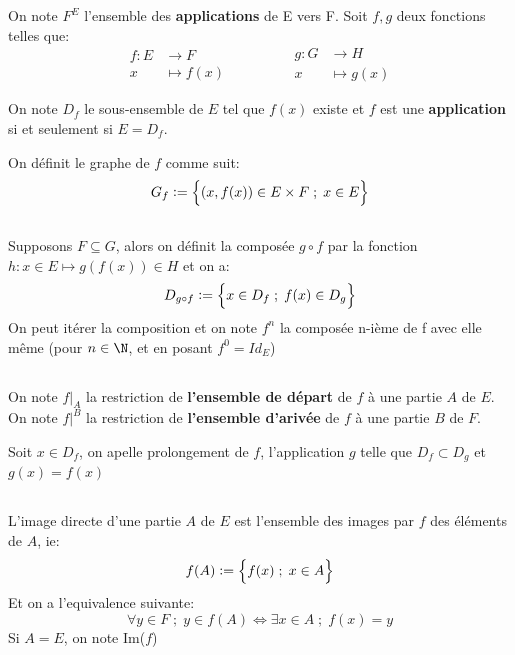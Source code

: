\chapter*{}
On note \(F^E\) l'ensemble des \textbf{applications} de E vers F.\+
Soit \(f, g\) deux fonctions telles que:
\[
   \begin{aligned}
      f: E &\longrightarrow F\\
      x &\longmapsto f(x)
   \end{aligned}
      \hspace{50pt}
   \begin{aligned}
      g: G&\longrightarrow H\\
      x&\longmapsto g(x)
   \end{aligned}
\]

On note \(D_f\) le sous-ensemble de \(E\) tel que \(f(x)\) existe et \(f\) est une \textbf{application} si et seulement si \(E = D_f\).\<

On définit le graphe de \(f\) comme suit:
\[
   G_f:= \Bigl\{ (x, f(x)) \in E \times F \; ; \; x \in E\Bigl\}   
\]

\section*{}
Supposons \(F \subseteq G\), alors on définit la composée \(g \circ f\) par la fonction \(h: x \in E \longmapsto g(f(x)) \in H\) et on a:
\[
   D_{g \circ f} := \Bigl\{ x \in D_f \; ; \; f(x) \in D_g \Bigl\}   
\]
On peut itérer la composition et on note \(f^{n}\) la composée n-ième de f avec elle même (pour \(n \in \N\), et en posant \(f^0 = Id_E\))
\section*{}
On note \(f|_A\) la restriction de \textbf{l'ensemble de départ} de \(f\) à une partie \(A\) de \(E\).\+
On note \(f|^B\) la restriction de \textbf{l'ensemble d'arivée} de \(f\) à une partie \(B\) de \(F\).\<

Soit \(x \in D_f\), on apelle prolongement de \(f\), l'application \(g\) telle que \(D_f \subset D_g\) et \(g(x) = f(x)\)
\section*{}
L'image directe d'une partie \(A\) de \(E\) est l'ensemble des images par \(f\) des éléments de \(A\), ie:
\[
   f(A) := \Bigl\{ f(x) \; ; \; x \in A \Bigl\}   
\]
Et on a l'equivalence suivante:
\[
   \forall y \in F \; ; \; y \in f(A) \Longleftrightarrow \exists x \in A \; ; \; f(x) = y
\]
Si \(A = E\), on note Im(\(f\))
